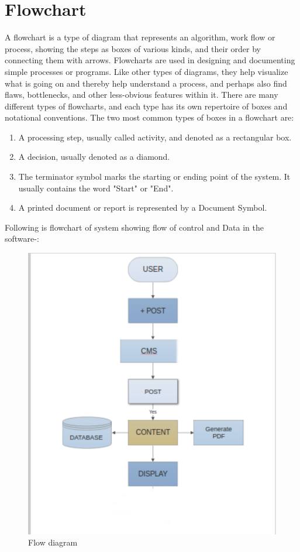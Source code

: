 \section{Flowchart}
A flowchart is a type of diagram that represents an algorithm, work flow or process, showing the steps as boxes of various kinds, and their order by connecting them with arrows. 
Flowcharts are used in designing and documenting simple processes or programs. Like other types of diagrams, they help visualize what is going on and thereby help understand a process, and perhaps also find flaws, bottlenecks, and other less-obvious features within it. There are many different types of flowcharts, and each type has its own repertoire of boxes and notational conventions. The two most common types of boxes in a flowchart are:
\begin{enumerate}
\item A processing step, usually called activity, and denoted as a rectangular box.
\item A decision, usually denoted as a diamond.
\item The terminator symbol marks the starting or ending point of the system. It usually contains the word "Start" or "End".
\item A printed document or report is represented by a Document Symbol.
\end{enumerate}
Following is flowchart of system showing flow of control and Data in the software-:

\begin{figure}[h!]
\centering \includegraphics[scale=0.8]{input/images/fc.pdf}
\caption{ Flow diagram}
\label{fig:UI1}
\end{figure}

